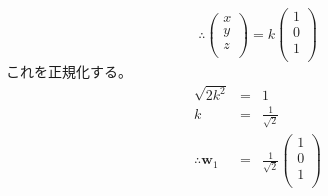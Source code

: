 \begin{enumerate}
\[\therefore \left(
\begin{array}{c}
x\\
y\\
z\\
\end{array}
\right)
= k
\left(
\begin{array}{c}
1\\
0\\
1\\
\end{array}
\right)
\]
これを正規化する。
\begin{eqnarray*}
\sqrt{2k^2} & = & 1 \\
k & = & \frac{1}{\sqrt{2}}\\
\therefore {\mathbf w}_1 & = & \frac{1}{\sqrt{2}}\left(
\begin{array}{c}
1\\
0\\
1\\
\end{array}
\right)\\ 
\end{eqnarray*}


\end{enumerate}

